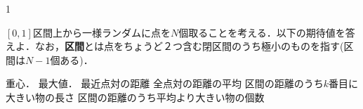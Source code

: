 1

  $[0,1]$区間上から一様ランダムに点を$N$個取ることを考える．以下の期待値を答えよ．なお，\textbf{区間}とは点をちょうど２つ含む閉区間のうち極小のものを指す(区間は$N-1$個ある)．
\begin{qlist}
  \qitem 重心．
  \qitem 最大値．
  \qitem 最近点対の距離
  \qitem 全点対の距離の平均
  \qitem 区間の距離のうち$k$番目に大きい物の長さ
  \qitem 区間の距離のうち平均より大きい物の個数
\end{qlist}

